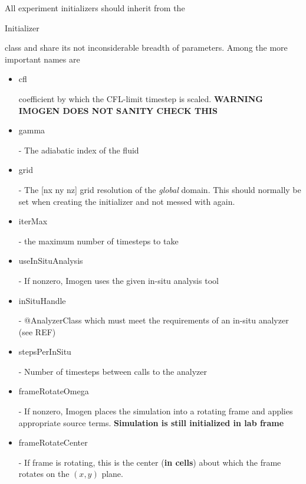\documentclass[letterpaper,12pt,twocolumn]{article}
\begin{document}
All experiment initializers should inherit from the \begin{tt}Initializer\end{tt} class
and share its not inconsiderable breadth of parameters. Among the more important 
names are
\begin{itemize}
\item \begin{tt}cfl\end{tt} coefficient by which the CFL-limit timestep is scaled. \textbf{WARNING
IMOGEN DOES NOT SANITY CHECK THIS}
\item \begin{tt}gamma\end{tt} - The adiabatic index of the fluid
\item \begin{tt}grid\end{tt} - The [nx ny nz] grid resolution of the \textit{global} domain. This
should normally be set when creating the initializer and not messed with again.
\item \begin{tt}iterMax\end{tt} - the maximum number of timesteps to take
\item \begin{tt}useInSituAnalysis\end{tt} - If nonzero, Imogen uses the given in-situ analysis tool
\item \begin{tt}inSituHandle\end{tt} - @AnalyzerClass which must meet the requirements of an
in-situ analyzer (see REF)
\item \begin{tt}stepsPerInSitu\end{tt} - Number of timesteps between calls to the analyzer
\item \begin{tt}frameRotateOmega\end{tt} - If nonzero, Imogen places the simulation into a rotating
frame and applies appropriate source terms. \textbf{Simulation is still initialized in lab frame}
\item \begin{tt}frameRotateCenter\end{tt} - If frame is rotating, this is the center (\textbf{in cells})
about which the frame rotates on the $(x,y)$ plane.
\end{itemize}
\end{document}
